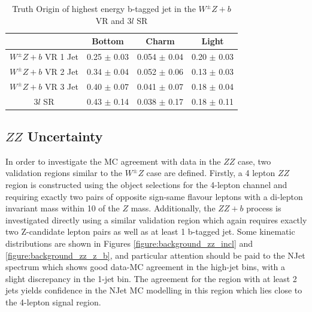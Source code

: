\begin{table}[htbp]
\centering 
\begin{tabular}{|c|c|c|c|} 
  \hline
  & Bottom  & Charm & Light \\
  \hline
  $W^{\pm}Z+b$ VR 1 Jet& 0.25 $\pm$ 0.03 & 0.054  $\pm$ 0.04 & 0.20 $\pm$ 0.03 \\ 
  $W^{\pm}Z+b$ VR 2 Jet& 0.34 $\pm$ 0.04 & 0.052  $\pm$ 0.06 & 0.13 $\pm$ 0.03 \\ 
  $W^{\pm}Z+b$ VR 3 Jet& 0.40 $\pm$ 0.07 & 0.041  $\pm$ 0.07 & 0.18 $\pm$ 0.04 \\
  3$l$ SR              & 0.43 $\pm$ 0.14 & 0.038  $\pm$ 0.17 & 0.18 $\pm$ 0.11 \\
  \hline 
\end{tabular}
\caption{Truth Origin of highest energy b-tagged jet in the $W^{\pm}Z+b$ VR and 3$l$ SR} 
\label{table:wz_truth}
\end{table} 

\subsection{$ZZ$ Uncertainty}

In order to investigate the MC agreement with data in the $ZZ$ case, two validation regions similar to the $W^{\pm}Z$ case are defined. 
Firstly, a 4 lepton $ZZ$ region is constructed using the object selections for the 4-lepton channel and requiring exactly two pairs of 
opposite sign-same flavour leptons with a di-lepton invariant mass within 10 \gevcc of the $Z$ mass. Additionally, the $ZZ+b$ process 
is investigated directly using a similar validation region which again requires exactly two Z-candidate lepton pairs as well as at least 
1 b-tagged jet. Some kinematic distributions are shown in Figures \ref{figure:background_zz_incl} and \ref{figure:background_zz_z_b}, and particular attention should be paid to the NJet spectrum 
which shows good data-MC agreement in the high-jet bins, with a slight discrepancy in the 1-jet bin. The agreement for the region with at least 
2 jets yields confidence in the NJet MC modelling in this region which lies close to the 4-lepton signal region. 

